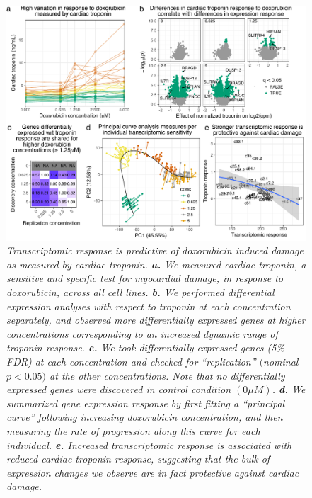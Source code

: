 \documentclass{article}
\begin{document}
{\begin{figure}
\begin{center}
    \includegraphics[width=1\textwidth]{../figures/fig4_troponin.pdf}     \caption{\it{Transcriptomic response is predictive of doxorubicin induced damage as measured by cardiac troponin. \textbf{a.} We measured cardiac troponin, a sensitive and specific test for myocardial damage, in response to doxorubicin, across all cell lines. \textbf{b.} We performed differential expression analyses with respect to troponin at each concentration separately, and observed more differentially expressed genes at higher concentrations corresponding to an increased dynamic range of troponin response. \textbf{c.} We took differentially expressed genes (5\% FDR) at each concentration and checked for ``replication'' $($nominal $p<0.05)$ at the other concentrations. Note that no differentially expressed genes were discovered in control condition $(0 \mu M)$. \textbf{d.} We summarized gene expression response by first fitting a ``principal curve'' following increasing doxorubicin concentration, and then measuring the rate of progression along this curve for each individual. \textbf{e.} Increased transcriptomic response is associated with reduced cardiac troponin response, suggesting that the bulk of expression changes we observe are in fact protective against cardiac damage.}}
    \label{fig_troponin}
    \end{center}
\end{figure}

}
\end{document}
